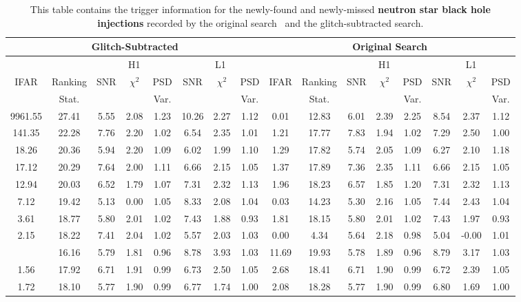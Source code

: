 \newpage

\begin{landscape}
\begin{table}[tb]
\centering
\caption{\label{4:tab:apdx_changed_snr_nsbh}This table contains the trigger information for the newly-found and newly-missed \textbf{neutron star black hole injections} recorded by the original search~\cite{gwtc3:2023} and the glitch-subtracted search.} 
\begin{tabular}{|c|c|c|c|c|c|c|c||c|c|c|c|c|c|c|c|}
\hline
\multicolumn{8}{|c||}{Glitch-Subtracted} & \multicolumn{8}{c|}{Original Search} \\
\hline
\multicolumn{2}{|c|}{} & \multicolumn{3}{c|}{H1} & \multicolumn{3}{c||}{L1} & \multicolumn{2}{c|}{} & \multicolumn{3}{c|}{H1} & \multicolumn{3}{c|}{L1}\\
\hline
IFAR & Ranking & SNR & $\chi^{2}$ & PSD & SNR & $\chi^{2}$ & PSD & IFAR & Ranking & SNR & $\chi^{2}$ & PSD & SNR & $\chi^{2}$ & PSD \\ &
Stat. & & & Var. & & & Var. & & Stat. & & & Var. & & & Var.\\
\hline
9961.55 & 27.41 & 5.55 & 2.08 & 1.23 & 10.26 & 2.27 & 1.12 & 0.01 & 12.83 & 6.01 & 2.39 & 2.25 & 8.54 & 2.37 & 1.12 \\
141.35 & 22.28 & 7.76 & 2.20 & 1.02 & 6.54 & 2.35 & 1.01 & 1.21 & 17.77 & 7.83 & 1.94 & 1.02 & 7.29 & 2.50 & 1.00 \\
18.26 & 20.36 & 5.94 & 2.20 & 1.09 & 6.02 & 1.99 & 1.10 & 1.29 & 17.82 & 5.74 & 2.05 & 1.09 & 6.27 & 2.10 & 1.18 \\
17.12 & 20.29 & 7.64 & 2.00 & 1.11 & 6.66 & 2.15 & 1.05 & 1.37 & 17.89 & 7.36 & 2.35 & 1.11 & 6.66 & 2.15 & 1.05 \\
12.94 & 20.03 & 6.52 & 1.79 & 1.07 & 7.31 & 2.32 & 1.13 & 1.96 & 18.23 & 6.57 & 1.85 & 1.20 & 7.31 & 2.32 & 1.13 \\
7.12 & 19.42 & 5.13 & 0.00 & 1.05 & 8.33 & 2.08 & 1.04 & 0.03 & 14.23 & 5.30 & 2.16 & 1.05 & 7.44 & 2.43 & 1.04 \\
3.61 & 18.77 & 5.80 & 2.01 & 1.02 & 7.43 & 1.88 & 0.93 & 1.81 & 18.15 & 5.80 & 2.01 & 1.02 & 7.43 & 1.97 & 0.93 \\
2.15 & 18.22 & 7.41 & 2.04 & 1.02 & 5.57 & 2.03 & 1.03 & 0.00 & 4.34 & 5.64 & 2.18 & 0.98 & 5.04 & -0.00 & 1.01 \\
\hdashline
0.23 & 16.16 & 5.79 & 1.81 & 0.96 & 8.78 & 3.93 & 1.03 & 11.69 & 19.93 & 5.78 & 1.89 & 0.96 & 8.79 & 3.17 & 1.03 \\
1.56 & 17.92 & 6.71 & 1.91 & 0.99 & 6.73 & 2.50 & 1.05 & 2.68 & 18.41 & 6.71 & 1.90 & 0.99 & 6.72 & 2.39 & 1.05 \\
1.72 & 18.10 & 5.77 & 1.90 & 0.99 & 6.77 & 1.74 & 1.00 & 2.08 & 18.28 & 5.77 & 1.90 & 0.99 & 6.80 & 1.69 & 1.00 \\
\hline
\end{tabular}
\end{table}
\end{landscape}
\restoregeometry %

